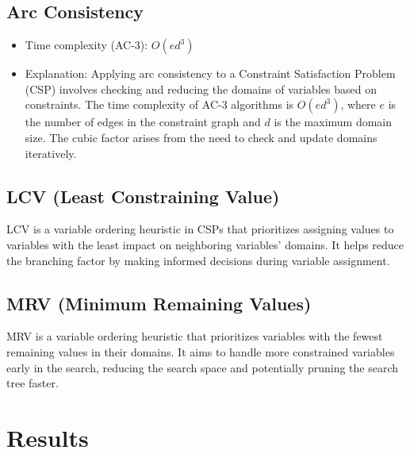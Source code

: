 \documentclass{article}
\begin{document}
\subsection*{Arc Consistency}
\begin{itemize}
  \item Time complexity (AC-3): $O(ed^3)$
  \item Explanation: Applying arc consistency to a Constraint Satisfaction Problem (CSP) involves checking and reducing the domains of variables based on constraints. The time complexity of AC-3 algorithms is $O(ed^3)$, where $e$ is the number of edges in the constraint graph and $d$ is the maximum domain size. The cubic factor arises from the need to check and update domains iteratively. 
\end{itemize}

\subsection*{LCV (Least Constraining Value)}
LCV is a variable ordering heuristic in CSPs that prioritizes assigning values to variables with the least impact on neighboring variables' domains. It helps reduce the branching factor by making informed decisions during variable assignment.

\subsection*{MRV (Minimum Remaining Values)}
MRV is a variable ordering heuristic that prioritizes variables with the fewest remaining values in their domains. It aims to handle more constrained variables early in the search, reducing the search space and potentially pruning the search tree faster.


\section{Results}
\end{document}
